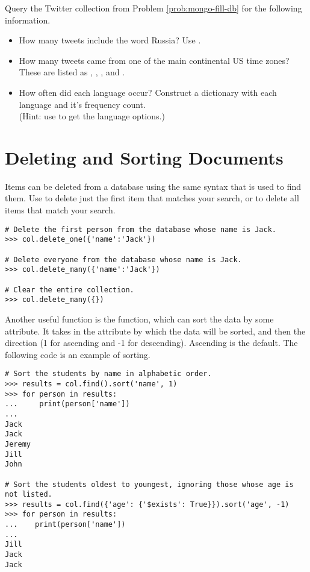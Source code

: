 \begin{problem}
Query the Twitter collection from Problem \ref{prob:mongo-fill-db} for the following information.
\begin{itemize}
    \item How many tweets include the word Russia? Use .
    \item How many tweets came from one of the main continental US time zones? These are listed as , , , and .
    \item How often did each language occur? Construct a dictionary with each language and it's frequency count.
    \\(Hint: use  to get the language options.)
\end{itemize}
\end{problem}

\section*{Deleting and Sorting Documents}

Items can be deleted from a database using the same syntax that is used to find them. Use  to delete just the first item that matches your search, or  to delete all items that match your search.

\begin{lstlisting}
# Delete the first person from the database whose name is Jack.
>>> col.delete_one({'name':'Jack'})

# Delete everyone from the database whose name is Jack.
>>> col.delete_many({'name':'Jack'})

# Clear the entire collection.
>>> col.delete_many({})
\end{lstlisting}

Another useful function is the  function, which can sort the data by some attribute. It takes in the attribute by which the data will be sorted, and then the direction (1 for ascending and -1 for descending). Ascending is the default. The following code is an example of sorting.

\begin{lstlisting}
# Sort the students by name in alphabetic order.
>>> results = col.find().sort('name', 1)
>>> for person in results:
...     print(person['name'])
...
Jack
Jack
Jeremy
Jill
John

# Sort the students oldest to youngest, ignoring those whose age is not listed.
>>> results = col.find({'age': {'$exists': True}}).sort('age', -1)
>>> for person in results:
...    print(person['name'])
...
Jill
Jack
Jack
\end{lstlisting}


